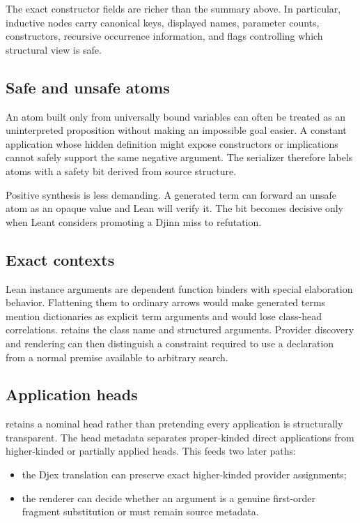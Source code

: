 \documentclass[10pt,letterpaper,oneside]{report}
\newcommand{\code}[1]{\texttt{\detokenize{#1}}}
\begin{document}
The exact constructor fields are richer than the summary above. In particular, inductive nodes carry canonical keys, displayed names, parameter counts, constructors, recursive occurrence information, and flags controlling which structural view is safe.

\subsection{Safe and unsafe atoms}

An atom built only from universally bound variables can often be treated as an uninterpreted proposition without making an impossible goal easier. A constant application whose hidden definition might expose constructors or implications cannot safely support the same negative argument. The serializer therefore labels atoms with a safety bit derived from source structure.

Positive synthesis is less demanding. A generated term can forward an unsafe atom as an opaque value and Lean will verify it. The bit becomes decisive only when Leant considers promoting a Djinn miss to refutation.

\subsection{Exact contexts}

Lean instance arguments are dependent function binders with special elaboration behavior. Flattening them to ordinary arrows would make generated terms mention dictionaries as explicit term arguments and would lose class-head correlations. \code{FExactContext} retains the class name and structured arguments. Provider discovery and rendering can then distinguish a constraint required to use a declaration from a normal premise available to arbitrary search.

\subsection{Application heads}

\code{FApp} retains a nominal head rather than pretending every application is structurally transparent. The head metadata separates proper-kinded direct applications from higher-kinded or partially applied heads. This feeds two later paths:

\begin{itemize}
  \item the Djex translation can preserve exact higher-kinded provider assignments;
  \item the renderer can decide whether an argument is a genuine first-order fragment substitution or must remain source metadata.
\end{itemize}
\end{document}
